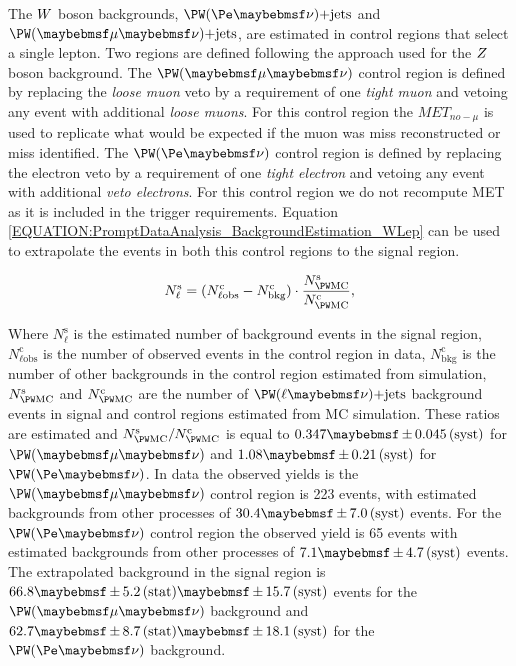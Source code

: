 The $W$ boson backgrounds, $\PW (\Pe \nu)\text{+jets}$ and $\PW (\mu \nu)\text{+jets}$, are estimated in control regions that select a single lepton. Two regions are defined following the approach used for the $Z$ boson background. The $\PW (\mu \nu)$ control region is defined by replacing the \textit{loose muon} veto by a requirement of one \textit{tight muon} and vetoing any event with additional \textit{loose muons}. For this control region the $MET_{no-\mu}$ is used to replicate what would be expected if the muon was miss reconstructed or miss identified. The $\PW (\Pe \nu)$ control region is defined by replacing the electron veto by a requirement of one \textit{tight electron} and vetoing any event with additional \textit{veto electrons}. For this control region we do not recompute \gls{MET} as it is included in the trigger requirements. Equation \ref{EQUATION:PromptDataAnalysis_BackgroundEstimation_WLep} can be used to extrapolate the events in both this control regions to the signal region.

\begin{equation}
N^\mathrm{s}_\ell = (N^\mathrm{c}_{\ell\text{obs}} - N^\mathrm{c}_\text{bkg}) \cdot \frac{N^\mathrm{s}_{\PW \mathrm{MC}}}{N^\mathrm{c}_{\PW \mathrm{MC}}},
\label{EQUATION:PromptDataAnalysis_BackgroundEstimation_WLep}
\end{equation}

Where $N^\mathrm{s}_\ell$ is the estimated number of background events in the signal region, $N^\mathrm{c}_{\ell\text{obs}}$ is the number of observed events in the control region in data, $N^\mathrm{c}_\text{bkg}$ is the number of other backgrounds in the control region estimated from simulation, $N^\mathrm{s}_{\PW \mathrm{MC}}$ and $N^\mathrm{c}_{\PW \mathrm{MC}}$  are the number of $\PW (\ell \nu)\text{+jets}$ background events in signal and control regions estimated from \gls{MC} simulation. These ratios are estimated and $N^\mathrm{s}_{\PW \mathrm{MC}}/N^\mathrm{c}_{\PW \mathrm{MC}}$ is equal to $0.347 \pm 0.045\syst$ for $\PW (\mu \nu)$ and $1.08 \pm 0.21\syst$ for $\PW (\Pe \nu)$. In data the observed yields is the $\PW (\mu \nu)$ control region is 223 events, with estimated backgrounds from other processes of $30.4 \pm 7.0\syst$ events. For the $\PW (\Pe \nu)$ control region the observed yield is 65 events with estimated backgrounds from other processes of $7.1 \pm 4.7\syst$ events. The  extrapolated background in the signal region is $66.8 \pm 5.2\stat \pm 15.7\syst$ events for the $\PW (\mu \nu)$ background and  $62.7 \pm 8.7\stat \pm 18.1\syst$ for the $\PW (\Pe \nu)$ background.

